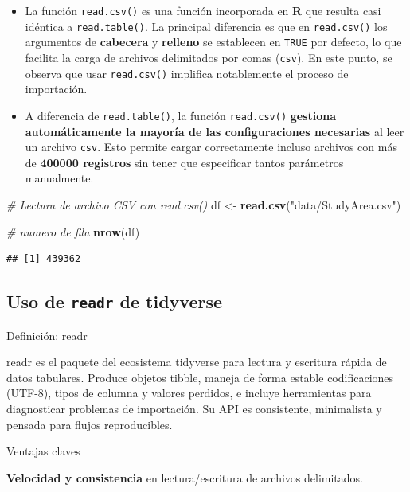 \documentclass[
]{book}
\newenvironment{Shaded}{\begin{snugshade}}{\end{snugshade}}
\newcommand{\CommentTok}[1]{\textcolor[rgb]{0.56,0.35,0.01}{\textit{#1}}}
\newcommand{\FunctionTok}[1]{\textcolor[rgb]{0.13,0.29,0.53}{\textbf{#1}}}
\newcommand{\NormalTok}[1]{#1}
\newcommand{\OtherTok}[1]{\textcolor[rgb]{0.56,0.35,0.01}{#1}}
\newcommand{\StringTok}[1]{\textcolor[rgb]{0.31,0.60,0.02}{#1}}
\begin{document}
\begin{itemize}
\item
  La función \texttt{read.csv()} es una función incorporada en \textbf{R} que resulta casi idéntica a \texttt{read.table()}. La principal diferencia es que en \texttt{read.csv()} los argumentos de \textbf{cabecera} y \textbf{relleno} se establecen en \texttt{TRUE} por defecto, lo que facilita la carga de archivos delimitados por comas (\texttt{csv}). En este punto, se observa que usar \texttt{read.csv()} implifica notablemente el proceso de importación.
\item
  A diferencia de \texttt{read.table()}, la función \texttt{read.csv()} \textbf{gestiona automáticamente la mayoría de las configuraciones necesarias} al leer un archivo \texttt{csv}. Esto permite cargar correctamente incluso archivos con más de \textbf{400000 registros} sin tener que especificar tantos parámetros manualmente.
\end{itemize}

\begin{Shaded}
\begin{Highlighting}[]
\CommentTok{\# Lectura de archivo CSV con read.csv()}
\NormalTok{df }\OtherTok{\textless{}{-}} \FunctionTok{read.csv}\NormalTok{(}\StringTok{"data/StudyArea.csv"}\NormalTok{)}

\CommentTok{\# numero de fila}
\FunctionTok{nrow}\NormalTok{(df)}
\end{Highlighting}
\end{Shaded}

\begin{verbatim}
## [1] 439362
\end{verbatim}

\subsection{\texorpdfstring{Uso de \texttt{readr} de tidyverse}{Uso de readr de tidyverse}}\label{uso-de-readr-de-tidyverse}

{} Definición: readr

readr es el paquete del ecosistema tidyverse para lectura y escritura rápida de datos tabulares.
Produce objetos tibble, maneja de forma estable codificaciones (UTF-8), tipos de columna y valores perdidos, e
incluye herramientas para diagnosticar problemas de importación. Su API es consistente, minimalista y pensada para flujos
reproducibles.

{} Ventajas claves

\textbf{Velocidad y consistencia} en lectura/escritura de archivos delimitados.
\end{document}
